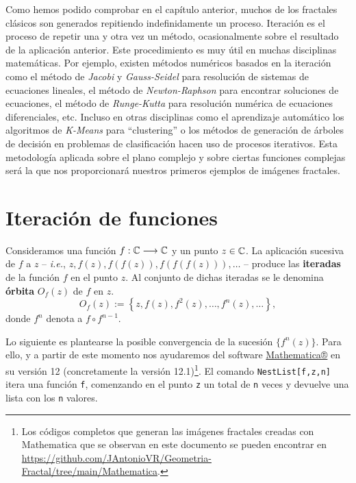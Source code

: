
Como hemos podido comprobar en el capítulo anterior, muchos de los fractales clásicos son generados repitiendo indefinidamente un proceso. Iteración es el proceso de repetir una y otra vez un método, ocasionalmente sobre el resultado de la aplicación anterior. Este procedimiento es muy útil en muchas disciplinas matemáticas. Por ejemplo, existen métodos numéricos basados en la iteración como el método de \textit{Jacobi} y \textit{Gauss-Seidel} para resolución de sistemas de ecuaciones lineales, el método de \textit{Newton-Raphson} para encontrar soluciones de ecuaciones, el método de \textit{Runge-Kutta} para resolución numérica de ecuaciones diferenciales, etc. Incluso en otras disciplinas como el aprendizaje automático los algoritmos de \textit{K-Means} para ``clustering'' o los métodos de generación de árboles de decisión en problemas de clasificación hacen uso de procesos iterativos. Esta metodología aplicada sobre el plano complejo y sobre ciertas funciones complejas será la que nos proporcionará nuestros primeros ejemplos de imágenes fractales.

\section{Iteración de funciones}
\begin{definicion}
    Consideramos una función $f:\mathbb{C}\longrightarrow\mathbb{C}$ y un punto $z\in\mathbb{C}$. La aplicación sucesiva de $f$ a $z$ -- \textit{i.e.}, $z,f(z),f(f(z)), f(f(f(z))),\dots$ -- produce las \textbf{iteradas} de la función $f$ en el punto $z$. Al conjunto de dichas iteradas se le denomina \textbf{órbita} $O_f(z)$ de $f$ en $z$.
    $$
    O_f(z):=\left\lbrace z, f(z), f^2(z), \dots, f^n(z), \dots\right\rbrace,
    $$
    donde $f^n$ denota a $f\circ f^{n-1}$.
\end{definicion}

Lo siguiente es plantearse la posible convergencia de la sucesión $\{f^n(z)\}$. Para ello, y a partir de este momento nos ayudaremos del software \textcolor{blue}{\href{https://www.wolfram.com/mathematica/}{Mathematica®}} en su versión 12 (concretamente la versión 12.1)\footnote{Los códigos completos que generan las imágenes fractales creadas con Mathematica que se observan en este documento se pueden encontrar en \url{https://github.com/JAntonioVR/Geometria-Fractal/tree/main/Mathematica}.}. El comando \verb|NestList[f,z,n]| itera una función \verb|f|, comenzando en el punto \verb|z| un total de \verb|n| veces y devuelve una lista con los \verb|n| valores. 

